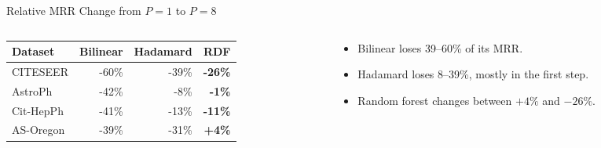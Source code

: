 \documentclass[aspectratio=169]{beamer}
\begin{document}
\begin{frame}{Relative MRR Change from $P=1$ to $P=8$}
  \begin{columns}
    \begin{column}{0.55\textwidth}
      \centering
      \small
      \begin{tabular}{lrrr}
        \toprule
        Dataset & Bilinear & Hadamard & RDF \\
        \midrule
        CITESEER  & -60\% & -39\% & \textbf{-26\%} \\
        AstroPh   & -42\% & -8\%  & \textbf{-1\%} \\
        Cit-HepPh & -41\% & -13\% & \textbf{-11\%} \\
        AS-Oregon & -39\% & -31\% & \textbf{+4\%} \\
        \bottomrule
      \end{tabular}
    \end{column}
    \begin{column}{0.40\textwidth}
      \footnotesize
      \begin{itemize}
        \item Bilinear loses 39--60\% of its MRR.
        \item Hadamard loses 8--39\%, mostly in the first step.
        \item Random forest changes between $+4\%$ and $-26\%$.
      \end{itemize}
    \end{column}
  \end{columns}
\end{frame}
\end{document}
